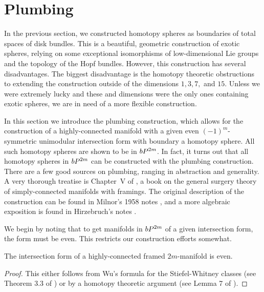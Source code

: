 \section{Plumbing}\label{sec:plumbing}

In the previous section, we constructed homotopy spheres as boundaries of total spaces of disk bundles. This is a beautiful, geometric construction of exotic spheres, relying on some exceptional isomorphisms of low-dimensional Lie groups and the topology of the Hopf bundles.
However, this construction has several disadvantages.
The biggest disadvantage is the homotopy theoretic obstructions to extending the construction outside of the dimensions $1,3,7,$ and $15$. Unless we were extremely lucky and these and dimensions were the only ones containing exotic spheres, we are in need of a more flexible construction.

In this section we introduce the plumbing construction, which allows for the construction of a highly-connected manifold with a given even $(-1)^m$-symmetric unimodular intersection form with boundary a homotopy sphere. All such homotopy spheres are shown to be in $bP^{2m}$. In fact, it turns out that all homotopy spheres in $bP^{2m}$ can be constructed with the plumbing construction.
There are a few good sources on plumbing, ranging in abstraction and generality. A very thorough treatise is Chapter~V of \cite{browder1972surgery}, a book on the general surgery theory of simply-connected manifolds with framings. The original description of the construction can be found in Milnor's 1958 notes \cite{milnor1958manifolds}, and a more algebraic exposition is found in Hirzebruch's notes \cite{hirzebruch1971quadratic}.

We begin by noting that to get manifolds in $bP^{2m}$ of a given intersection form, the form must be even. This restricts our construction efforts somewhat.

\begin{proposition}\label{prop:intersection-form-even}
	The intersection form of a highly-connected framed $2m$-manifold is even.
\end{proposition}
\begin{proof}
	This either follows from Wu's formula for the Stiefel-Whitney classes (see Theorem 3.3 of \cite{levine1985lectures}) or by a homotopy theoretic argument (see Lemma 7  of \cite{milnor1961procedure}).
\end{proof}

